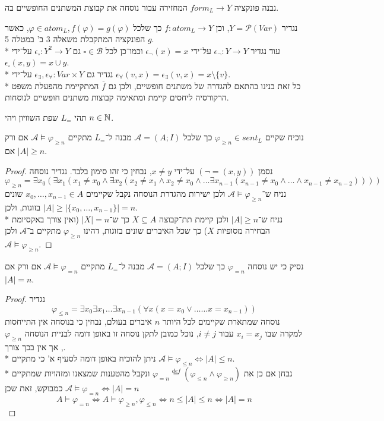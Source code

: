 \subquestion{}
נבנה פונקציה $form_L \to Y$ המחזירה עבור נוסחה את קבוצת המשתנים החופשיים בה.
\begin{solution}
	נגדיר $Y = \mathcal{P}(Var)$, וכן $f : atom_L \to Y$ כך שלכל $\varphi \in atom_L, f(\varphi) = g(\varphi)$, כאשר $g$ הפונקציה המתקבלת משאלה 3 ב' במטלה 5. \\*
	עוד נגדיר $\epsilon_\lnot : Y \to Y$ על־ידי $\epsilon_\lnot(x) = x$ וכמו־כן לכל $\square \in \mathcal{B}$ גם $\epsilon_\square : Y^2 \to Y$ על־ידי $\epsilon_\square(x, y) = x \cup y$. \\*
	נגדיר גם $\epsilon_\exists, \epsilon_\forall : Var \times Y$ על־ידי $\epsilon_\forall(v, x) = \epsilon_\exists(v, x) = x \setminus \{v\}$. \\*
	כל זאת בנינו בהתאם להגדרה של משתנים חופשיים, ולכן גם $\overline{f}$ המתקיימת מהפעלת משפט הרקורסיה ליחסים קיימת ומתאימה קבוצות משתנים חופשיים לנוסחות.
\end{solution}

\question{}
תהי $L_=$ שפת השוויון ויהי $n \in \mathbb{N}$.

\subquestion{}
נוכיח שקיים $\varphi_{\ge n} \in sent_L$ כך שלכל $\mathcal{A} = (A; I)$ מבנה ל־$L_=$ מתקיים $\mathcal{A} \models \varphi_{\ge n}$ אם ורק אם $|A| \ge n$.
\begin{proof}
	נסמן $(\lnot =(x, y))$ על־ידי $x \ne y$, נבחין כי זהו סימון בלבד.
	נגדיר נוסחה
	\[
		\varphi_{\ge n} = \exists x_0 (\exists x_1 (x_1 \ne x_0 \land \exists x_2 (x_2 \ne x_1 \land x_2 \ne x_0 \land \dots \exists x_{n - 1} (x_{n - 1} \ne x_0 \land \dots \land x_{n - 1} \ne x_{n - 2}))))
	\]
	נניח ש־$\mathcal{A} \models \varphi_{\ge n}$ ולכן ישירות מהגדרת הנוסחה נקבל שקיימים $x_0, \dots, x_{n - 1} \in A$ שונים בזוגות, ולכן $|A| \ge |\{x_0, \dots, x_{n - 1}\}| = n$. \\*
	נניח ש־$|A| \ge n$ ולכן קיימת תת־קבוצה $X \subseteq A$ כך ש־$|X| = n$ (ואין צורך באקסיומת הבחירה מסופיות $X$) כך שכל האיברים שונים בזוגות,
	דהינו $\varphi_{\ge n}$ מתקיים ב־$\mathcal{A}$ ולכן $\mathcal{A} \models \varphi_{\ge n}$.
\end{proof}

\subquestion{}
נסיק כי יש נוסחה $\varphi_{=n}$ כך שלכל $\mathcal{A} = (A; I)$ מבנה ל־$L_=$ מתקיים $\mathcal{A} \models \varphi_{= n}$ אם ורק אם $|A| = n$.
\begin{proof}
	נגדיר
	\[
		\varphi_{\le n} = \exists x_0 \exists x_1 \dots \exists x_{n - 1} (\forall x (x = x_0 \lor \dots \dots x = x_{n - 1}))
	\]
	נוסחה שמתארת שקיימים לכל היותר $n$ איברים בעולם, נבחין כי בנוסחה אין התייחסות למקרה שבו $x_i = x_j$ עבור $i \ne j$, נוכל כמובן לתקן נוסחה זו באופן דומה לבניית הנוסחה $\varphi_{\ge n}$, אך אין בכך צורך. \\*
	ניתן להוכיח באופן דומה לסעיף א' כי מתקיים $\mathcal{A} \models \varphi_{\le n} \iff |A| \le n$. \\*
	נבחן אם כן את $\varphi_{=n} \overset{def}{=} (\varphi_{\le n} \land \varphi_{\ge n})$ ונקבל מהטענות שמצאנו ומזהויות שמתקיים $\mathcal{A} \models \varphi_{= n} \iff |A| = n$ כמבוקש, זאת שכן
	\[
		A \models \varphi_{= n} \iff A \models \varphi_{\ge n}, \varphi_{\le n} \iff n \le |A| \le n \iff |A| = n
	\]
\end{proof}

